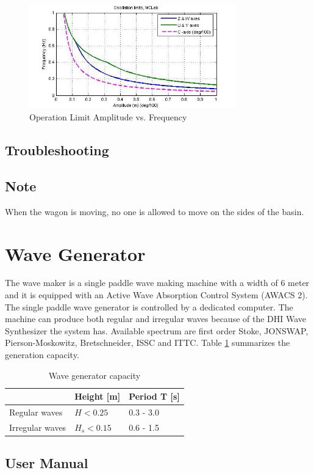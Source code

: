 \documentclass[a4paper,english]{report}
\begin{document}
\begin{figure}[htb!]
	\centering \includegraphics[width=0.8\textwidth]{fig/towing_ampvsfreq}
	\caption{\label{fig: Towing main-1-1}Operation Limit Amplitude vs. Frequency}
\end{figure}
\subsection{Troubleshooting}
\subsection{Note}
When the wagon is moving, no one is allowed to move on the sides of the basin.
\clearpage{}

\section{Wave Generator}\label{sec:wave_generator}
The wave maker is a single paddle wave making machine with a width of 6 meter and it is equipped with an Active Wave Absorption Control System (AWACS 2). The single paddle wave generator is controlled by a dedicated computer. The machine can produce both regular and irregular waves because of the DHI Wave Synthesizer the system has. Available spectrum are first order Stoke, JONSWAP, Pierson-Moskowitz, Bretschneider, ISSC and ITTC. Table \ref{tab:Wave generator capacity-1} summarizes the generation capacity.
\begin{table}[h!]
	\centering{}
	\begin{tabular}{lll}
		\hline 
		& Height {[}m{]} & Period T {[}s{]}\tabularnewline
		\hline 
		Regular waves & $H<0.25$ & 0.3 - 3.0\tabularnewline
		Irregular waves & \textbf{$H_{s}<0.15$} & 0.6 - 1.5\tabularnewline
		\hline 
	\end{tabular}\caption{\label{tab:Wave generator capacity-1}Wave generator capacity}
\end{table}
\subsection{User Manual}
\clearpage{}
\end{document}
